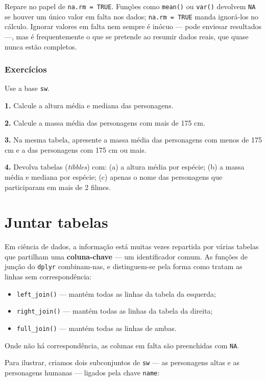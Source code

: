 \documentclass[
  portuguese,
  11pt,
  openany]{book}
\providecommand{\tightlist}{%
  \setlength{\itemsep}{0pt}\setlength{\parskip}{0pt}}
\begin{document}
Repare no papel de \texttt{na.rm\ =\ TRUE}. Funções como \texttt{mean()} ou \texttt{var()} devolvem \texttt{NA} se
houver um único valor em falta nos dados; \texttt{na.rm\ =\ TRUE} manda ignorá-los no cálculo.
Ignorar valores em falta nem sempre é inócuo --- pode enviesar resultados ---, mas é
frequentemente o que se pretende ao resumir dados reais, que quase nunca estão
completos.

\subsubsection{Exercícios}\label{exercuxedcios-19}

Use a base \texttt{sw}.

\textbf{1.} Calcule a altura média e mediana das personagens.

\textbf{2.} Calcule a massa média das personagens com mais de 175 cm.

\textbf{3.} Na mesma tabela, apresente a massa média das personagens com menos de 175 cm e
a das personagens com 175 cm ou mais.

\textbf{4.} Devolva tabelas (\emph{tibbles}) com: (a) a altura média por espécie; (b) a massa
média e mediana por espécie; (c) apenas o nome das personagens que participaram em mais
de 2 filmes.

\section{Juntar tabelas}\label{juntar-tabelas}

Em ciência de dados, a informação está muitas vezes repartida por várias tabelas que
partilham uma \textbf{coluna-chave} --- um identificador comum. As funções de junção do
\texttt{dplyr} combinam-nas, e distinguem-se pela forma como tratam as linhas sem
correspondência:

\begin{itemize}
\tightlist
\item
  \texttt{left\_join()} --- mantém todas as linhas da tabela da esquerda;
\item
  \texttt{right\_join()} --- mantém todas as linhas da tabela da direita;
\item
  \texttt{full\_join()} --- mantém todas as linhas de ambas.
\end{itemize}

Onde não há correspondência, as colunas em falta são preenchidas com \texttt{NA}.

Para ilustrar, criamos dois subconjuntos de \texttt{sw} --- as personagens altas e as
personagens humanas --- ligados pela chave \texttt{name}:
\end{document}
